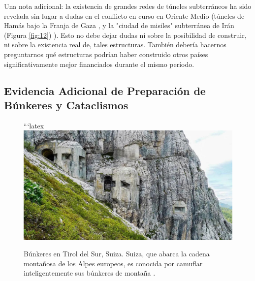 \documentclass[10pt,twocolumn,letterpaper]{article}
\begin{document}
Una nota adicional: la existencia de grandes redes de túneles subterráneos ha sido revelada sin lugar a dudas en el conflicto en curso en Oriente Medio (túneles de Hamás bajo la Franja de Gaza \cite{38}, y la "ciudad de misiles" subterránea de Irán (Figura \ref{fig:12}) \cite{39,40}). Esto no debe dejar dudas ni sobre la posibilidad de construir, ni sobre la existencia real de, tales estructuras. También debería hacernos preguntarnos qué estructuras podrían haber construido otros países significativamente mejor financiados durante el mismo período.

\subsection{Evidencia Adicional de Preparación de Búnkeres y Cataclismos}

\begin{figure}[t]
\begin{center}
```latex
   \includegraphics[width=1\linewidth]{tyrol.jpg}
\end{center}
   \caption{Búnkeres en Tirol del Sur, Suiza. Suiza, que abarca la cadena montañosa de los Alpes europeos, es conocida por camuflar inteligentemente sus búnkeres de montaña \cite{32}.}
\label{fig:7}
\label{fig:onecol}
\end{figure}
\end{document}
